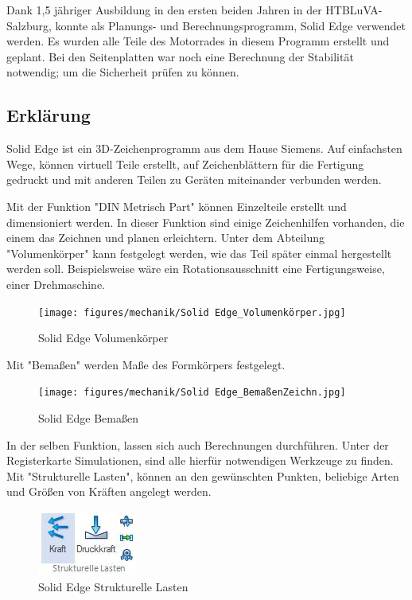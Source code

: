 Dank 1,5 jähriger Ausbildung in den ersten beiden Jahren in der HTBLuVA-Salzburg, konnte als Planungs- und Berechnungsprogramm, Solid Edge verwendet werden. 
Es wurden alle Teile des Motorrades in diesem Programm erstellt und geplant. Bei den Seitenplatten war noch eine Berechnung der Stabilität notwendig; um die Sicherheit prüfen zu können. 

\subsection{Erklärung}

Solid Edge ist ein 3D-Zeichenprogramm aus dem Hause Siemens. Auf einfachsten Wege, können virtuell Teile erstellt, auf Zeichenblättern für die Fertigung gedruckt und mit anderen Teilen zu Geräten miteinander verbunden werden. 

Mit der Funktion "DIN Metrisch Part" können Einzelteile erstellt und dimensioniert werden. In dieser Funktion sind einige Zeichenhilfen vorhanden, die einem das Zeichnen und planen erleichtern. Unter dem Abteilung "Volumenkörper" kann festgelegt werden, wie das Teil später einmal hergestellt werden soll. Beispielsweise wäre ein Rotationsausschnitt eine Fertigungsweise, einer Drehmaschine.


\begin{figure} [H]
	\begin{center}
		\texttt{[image: figures/mechanik/Solid Edge\_Volumenkörper.jpg]}
			\caption{Solid Edge Volumenkörper}
			\label{fig:Solid Edge Volumenkörper}
	\end{center}
\end{figure}


Mit "Bemaßen" werden Maße des Formkörpers festgelegt.


\begin{figure} [H]
	\begin{center}
		\texttt{[image: figures/mechanik/Solid Edge\_BemaßenZeichn.jpg]}
			\caption{Solid Edge Bemaßen}
			\label{fig:Solid Edge Bemaßen}
	\end{center}
\end{figure}


In der selben Funktion, lassen sich auch Berechnungen durchführen.
Unter der Registerkarte Simulationen, sind alle hierfür notwendigen Werkzeuge zu finden.
Mit "Strukturelle Lasten", können an den gewünschten Punkten, beliebige Arten und Größen von Kräften angelegt werden. 


\begin{figure} [H]
	\begin{center}
		\includegraphics[scale=0.4]{figures/mechanik/Solid Edge_Strukturelle Lasten.jpg}
			\caption{Solid Edge Strukturelle Lasten}
			\label{fig:Solid Edge Strukturelle Lasten}
	\end{center}
\end{figure}


